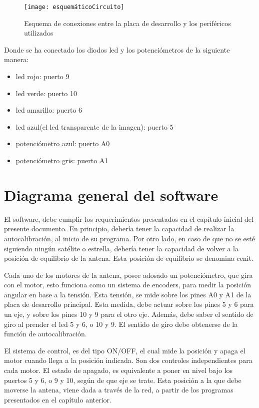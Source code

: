 \begin{figure}[p]
	\centering 
	\texttt{[image: esquemáticoCircuito]}
	\caption{Esquema de conexiones entre la placa de desarrollo y los periféricos utilizados} 
	\label{fig:esq_completo} 
\end{figure}

Donde se ha conectado los diodos led y los potenciómetros de la siguiente manera: 
\begin{itemize}
	\label{item:prototipo_leds_pote}
	\item led rojo: puerto 9 
	\item led verde: puerto 10 
	\item led amarillo: puerto 6 
	\item led azul(el led transparente de la imagen): puerto 5 
	\item potenciómetro azul: puerto A0 
	\item potenciómetro gris: puerto A1 
	
\end{itemize}


\section{Diagrama general del software}

El software, debe cumplir los requerimientos presentados en el capítulo inicial del presente documento. En principio, debería tener la capacidad de realizar la autocalibración, al inicio de su programa. Por otro lado, en caso  de que no se esté siguiendo ningún satélite o estrella, debería tener la capacidad de volver a la posición de equilibrio de la antena. Esta posición de equilibrio se denomina cenit. 

Cada uno de los motores de la antena, posee adosado un potenciómetro, que gira con el motor, esto funciona como un sistema de encoders, para medir la posición angular en base a la tensión. Esta tensión, se mide sobre los pines A0 y A1 de la placa de desarrollo principal. Esta medida, debe actuar sobre los pines 5 y 6 para un eje, y sobre los pines 10 y 9 para el otro eje. Además, debe saber el sentido de giro al prender el led 5 y 6, o 10 y 9. El sentido de giro debe obtenerse de la función de autocalibración.  

El sistema de control, es del tipo ON/OFF, el cual mide la posición y apaga el motor cuando llega a la posición indicada. Son dos controles independientes para cada motor. El estado de apagado, es equivalente a poner en nivel bajo los puertos 5 y 6, o 9 y 10, según  de que eje se trate. Esta posición a la que debe moverse la antena, viene dada a través de la red, a partir de los programas presentados en el capítulo anterior. 

